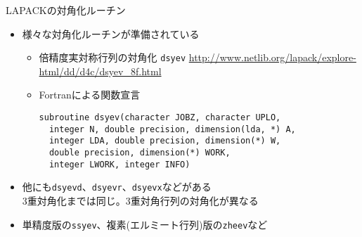 \begin{frame}[t,fragile]{LAPACKの対角化ルーチン}
  \begin{itemize}
  \item 様々な対角化ルーチンが準備されている
    \begin{itemize}
    \item 倍精度実対称行列の対角化 {\tt dsyev}
      \url{http://www.netlib.org/lapack/explore-html/dd/d4c/dsyev_8f.html}
    \item Fortranによる関数宣言
\begin{lstlisting}
subroutine dsyev(character JOBZ, character UPLO,
  integer N, double precision, dimension(lda, *) A,
  integer LDA, double precision, dimension(*) W,
  double precision, dimension(*) WORK,
  integer LWORK, integer INFO)		
\end{lstlisting}
    \end{itemize}
  \item 他にも{\tt dsyevd}、{\tt dsyevr}、{\tt dsyevx}などがある \\
    3重対角化までは同じ。3重対角行列の対角化が異なる
  \item 単精度版の{\tt ssyev}、複素(エルミート行列)版の{\tt zheev}など
  \end{itemize}
\end{frame}
